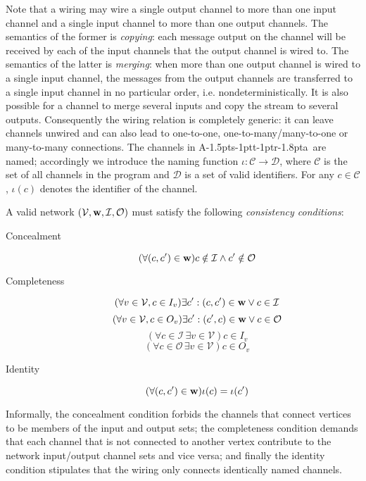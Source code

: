 \documentclass[11pt]{report}
\def\ak{{\textsf{A\kern-1.5pts\kern-1ptt\kern-1ptr\kern-1.8pta}}\kern-2pt{\it K\kern-2ptahn}}
\begin{document}
Note that a wiring may wire a single output channel to more than one input channel
and a single input channel to more than one output channels. The semantics of the former is {\em copying}: each message output on the channel will be received by each of the input channels that the output channel is wired to. The semantics of the latter is {\em merging}: when more than one output channel is wired to a single input channel, the messages from the output channels are transferred to a single input channel in no particular order, i.e. nondeterministically. It is also possible for a channel to merge several inputs and copy the stream to several outputs. Consequently the wiring relation is completely generic: it can leave channels unwired and can also lead to one-to-one, one-to-many/many-to-one or many-to-many connections.  The channels in \ak\ are named; accordingly we introduce the naming function $\iota: \mathcal{C}\to \mathcal{D}$, where $\mathcal{C}$ is the set of all channels in the program and $\mathcal{D}$ is a set of valid identifiers.
For any $c\in \mathcal{C}$, $\iota(c)$ denotes the identifier of the channel.

A valid network $(\mathcal{V}, \hbox{\bf w}, \mathcal{I}, \mathcal{O})$ must satisfy the following {\em consistency conditions}:
\begin{description}
\item[Concealment]  \[(\forall  (c,c^\prime)\in {\bf w}) c\notin \mathcal{I}\wedge c^\prime\notin\mathcal{O}\]
\item[Completeness] \[(\forall v\in \mathcal{V}, c\in I_v) \exists c^\prime: (c,c^\prime)\in {\bf w} \vee c\in \mathcal{I}\]
\[(\forall v\in \mathcal{V}, c\in O_v) \exists c^\prime: (c^\prime,c)\in {\bf w} \vee c\in \mathcal{O}\]
\[(\forall c\in\mathcal{I}\,\exists v\in\mathcal{V}) c\in I_v\]
\[(\forall c\in\mathcal{O}\,\exists v\in\mathcal{V}) c\in O_v\]
\item[Identity]
\[(\forall  (c,c^\prime)\in {\bf w})\iota(c)=\iota(c^\prime)\]
\end{description}

Informally, the concealment condition forbids the channels that connect vertices to be members
of the input and output sets; the completeness condition demands that each channel that is not connected to another
vertex contribute to the network input/output channel sets and vice versa; and finally the identity condition
stipulates that the wiring only connects identically named channels.
\end{document}
